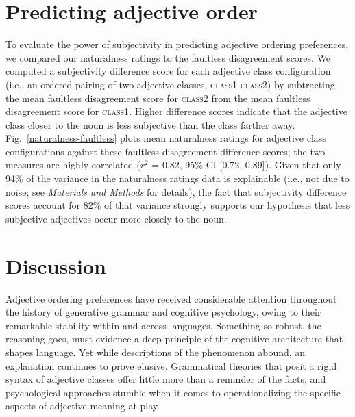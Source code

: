 \documentclass{pnastwo}
\begin{document}
\begin{article}
\section{Predicting adjective order}

To evaluate the power of subjectivity in predicting adjective ordering preferences, we compared our naturalness ratings to the faultless disagreement scores. We  computed a subjectivity difference score for each adjective class configuration (i.e., an ordered pairing of two adjective classes, \textsc{class1}-\textsc{class2}) by subtracting the mean faultless disagreement score for \textsc{class2} from the mean faultless disagreement score for \textsc{class1}. Higher difference scores indicate that the adjective class closer to the noun is less subjective than the class farther away. Fig.~\ref{naturalness-faultless} plots mean naturalness ratings for adjective class configurations against these faultless disagreement difference scores; the two measures are highly correlated ($r^2$ = 0.82, 95\% CI [0.72, 0.89]). Given that only 94\% of the variance in the naturalness ratings data is explainable (i.e., not due to noise; see \emph{Materials and Methods} for details), the fact that subjectivity difference scores account for 82\% of that variance strongly supports our hypothesis that less subjective adjectives occur more closely to the noun. 

\section{Discussion}

Adjective ordering preferences have received considerable attention throughout the history of generative grammar and cognitive psychology, owing to their remarkable stability within and across languages. Something so robust, the reasoning goes, must evidence a deep principle of the cognitive architecture that shapes language. Yet while descriptions of the phenomenon abound, an explanation continues to prove elusive. Grammatical theories that posit a rigid syntax of adjective classes offer little more than a reminder of the facts, and psychological approaches stumble when it comes to operationalizing the specific aspects of adjective meaning at play. 


\end{article}
\end{document}
